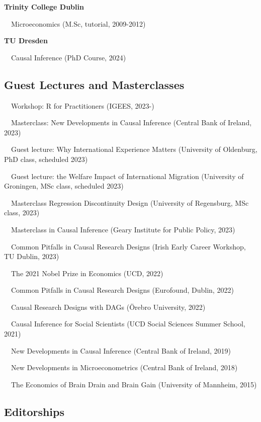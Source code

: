 \documentclass[10pt,a4paper,]{article}
\begin{document}
\textbf{Trinity College Dublin}

~~Microeconomics (M.Sc, tutorial, 2009-2012)

\medskip

\textbf{TU Dresden}

~~Causal Inference (PhD Course, 2024)

\hypertarget{guest-lectures-and-masterclasses}{%
\subsection{Guest Lectures and
Masterclasses}\label{guest-lectures-and-masterclasses}}

~~Workshop: R for Practitioners (IGEES, 2023-)

~~Masterclass: New Developments in Causal Inference (Central Bank of
Ireland, 2023)

~~Guest lecture: Why International Experience Matters (University of
Oldenburg, PhD class, scheduled 2023)

~~Guest lecture: the Welfare Impact of International Migration
(University of Groningen, MSc class, scheduled 2023)

~~Masterclass Regression Discontinuity Design (University of Regensburg,
MSc class, 2023)

~~Masterclass in Causal Inference (Geary Institute for Public Policy,
2023)

~~Common Pitfalls in Causal Research Designs (Irish Early Career
Workshop, TU Dublin, 2023)

~~The 2021 Nobel Prize in Economics (UCD, 2022)

~~Common Pitfalls in Causal Research Designs (Eurofound, Dublin, 2022)

~~Causal Research Designs with DAGs (Örebro University, 2022)

~~Causal Inference for Social Scientists (UCD Social Sciences Summer
School, 2021)

~~New Developments in Causal Inference (Central Bank of Ireland, 2019)

~~New Developments in Microeconometrics (Central Bank of Ireland, 2018)

~~The Economics of Brain Drain and Brain Gain (University of Mannheim,
2015)

\hypertarget{editorships}{%
\subsection{Editorships}\label{editorships}}
\end{document}
